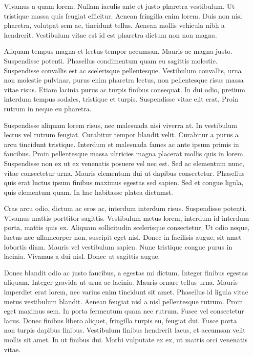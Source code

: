 \documentclass{article}
\begin{document}
Vivamus a quam lorem. Nullam iaculis ante et justo pharetra vestibulum. Ut tristique massa quis feugiat efficitur. Aenean fringilla enim lorem. Duis non nisl pharetra, volutpat sem ac, tincidunt tellus. Aenean mollis vehicula nibh a hendrerit. Vestibulum vitae est id est pharetra dictum non non magna.

Aliquam tempus magna et lectus tempor accumsan. Mauris ac magna justo. Suspendisse potenti. Phasellus condimentum quam eu sagittis molestie. Suspendisse convallis est ac scelerisque pellentesque. Vestibulum convallis, urna non molestie pulvinar, purus enim pharetra lectus, non pellentesque risus massa vitae risus. Etiam lacinia purus ac turpis finibus consequat. In dui odio, pretium interdum tempus sodales, tristique et turpis. Suspendisse vitae elit erat. Proin rutrum in neque eu pharetra.

Suspendisse aliquam lorem risus, nec malesuada nisi viverra at. In vestibulum lectus vel rutrum feugiat. Curabitur tempor blandit velit. Curabitur a purus a arcu tincidunt tristique. Interdum et malesuada fames ac ante ipsum primis in faucibus. Proin pellentesque massa ultricies magna placerat mollis quis in lorem. Suspendisse non ex ut ex venenatis posuere vel nec est. Sed ac elementum nunc, vitae consectetur urna. Mauris elementum dui ut dapibus consectetur. Phasellus quis erat luctus ipsum finibus maximus egestas sed sapien. Sed et congue ligula, quis elementum quam. In hac habitasse platea dictumst.

Cras arcu odio, dictum ac eros ac, interdum interdum risus. Suspendisse potenti. Vivamus mattis porttitor sagittis. Vestibulum metus lorem, interdum id interdum porta, mattis quis ex. Aliquam sollicitudin scelerisque consectetur. Ut odio neque, luctus nec ullamcorper non, suscipit eget nisl. Donec in facilisis augue, sit amet lobortis diam. Mauris vel vestibulum sapien. Nunc tristique congue purus in lacinia. Vivamus a dui nisl. Donec ut sagittis augue.

Donec blandit odio ac justo faucibus, a egestas mi dictum. Integer finibus egestas aliquam. Integer gravida ut urna ac lacinia. Mauris ornare tellus urna. Mauris imperdiet erat lorem, nec varius enim tincidunt sit amet. Phasellus id ligula vitae metus vestibulum blandit. Aenean feugiat nisl a nisl pellentesque rutrum. Proin eget maximus sem. In porta fermentum quam nec rutrum. Fusce vel consectetur lacus. Donec finibus libero aliquet, fringilla turpis eu, feugiat dui. Fusce porta non turpis dapibus finibus. Vestibulum finibus hendrerit lacus, et accumsan velit mollis sit amet. In ut finibus dui. Morbi vulputate ex ex, ut mattis orci venenatis vitae.
\end{document}
